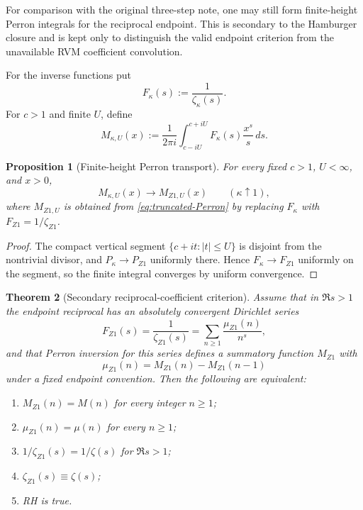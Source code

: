 \documentclass[11pt,reqno]{amsart}
\newtheorem{theorem}{Theorem}[section]
\newtheorem{proposition}[theorem]{Proposition}
\theoremstyle{definition}
\theoremstyle{remark}
\begin{document}
For comparison with the original three-step note, one may still form finite-height Perron integrals for the reciprocal endpoint.  This is secondary to the Hamburger closure and is kept only to distinguish the valid endpoint criterion from the unavailable RVM coefficient convolution.

For the inverse functions put
\begin{equation}\label{eq:Fkappa}
 F_\kappa(s):=\frac1{\zeta_\kappa(s)}.
\end{equation}
For $c>1$ and finite $U$, define
\begin{equation}\label{eq:truncated-Perron}
 M_{\kappa,U}(x)
 :=\frac1{2\pi i}\int_{c-iU}^{c+iU}
 F_\kappa(s)\frac{x^s}{s}\,ds.
\end{equation}

\begin{proposition}[Finite-height Perron transport]\label{prop:finite-Perron}
For every fixed $c>1$, $U<\infty$, and $x>0$,
\begin{equation}
 M_{\kappa,U}(x)\longrightarrow M_{Z1,U}(x)
 \qquad(\kappa\uparrow1),
\end{equation}
where $M_{Z1,U}$ is obtained from \eqref{eq:truncated-Perron} by replacing $F_\kappa$ with $F_{Z1}=1/\zeta_{Z1}$.
\end{proposition}

\begin{proof}
The compact vertical segment $\{c+it:|t|\le U\}$ is disjoint from the nontrivial divisor, and $P_\kappa\to P_{Z1}$ uniformly there.  Hence $F_\kappa\to F_{Z1}$ uniformly on the segment, so the finite integral converges by uniform convergence.
\end{proof}

\begin{theorem}[Secondary reciprocal-coefficient criterion]\label{thm:coefficient-criterion}
Assume that in $\Re s>1$ the endpoint reciprocal has an absolutely convergent Dirichlet series
\begin{equation}\label{eq:Z1-reciprocal-Dirichlet}
 F_{Z1}(s)=\frac1{\zeta_{Z1}(s)}
 =\sum_{n\ge1}\frac{\mu_{Z1}(n)}{n^s},
\end{equation}
and that Perron inversion for this series defines a summatory function $M_{Z1}$ with
\begin{equation}\label{eq:Z1-increments}
 \mu_{Z1}(n)=M_{Z1}(n)-M_{Z1}(n-1)
\end{equation}
under a fixed endpoint convention.  Then the following are equivalent:
\begin{enumerate}[label=\textup{(\roman*)}]
\item $M_{Z1}(n)=M(n)$ for every integer $n\ge1$;
\item $\mu_{Z1}(n)=\mu(n)$ for every $n\ge1$;
\item $1/\zeta_{Z1}(s)=1/\zeta(s)$ for $\Re s>1$;
\item $\zeta_{Z1}(s)\equiv\zeta(s)$;
\item RH is true.
\end{enumerate}
\end{theorem}
\end{document}
